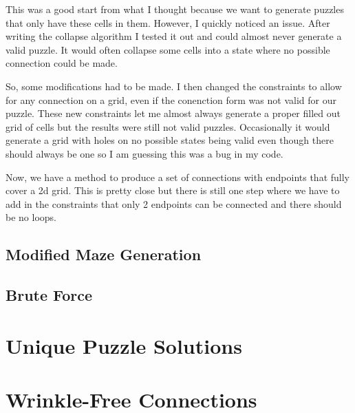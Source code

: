\documentclass[10pt,a4paper,openany]{article}
\begin{document}
This was a good start from what I thought because we want to generate puzzles that only have these cells in them. However, I quickly noticed an issue.
After writing the collapse algorithm I tested it out and could almost never generate a valid puzzle. It would often collapse some cells into a state where no possible connection could be made.

So, some modifications had to be made. I then changed the constraints to allow for any connection on a grid, even if the conenction form was not valid for our puzzle.
These new constraints let me almost always generate a proper filled out grid of cells but the results were still not valid puzzles.
Occasionally it would generate a grid with holes on no possible states being valid even though there should always be one so I am guessing this was a bug in my code.

Now, we have a method to produce a set of connections with endpoints that fully cover a 2d grid. This is pretty close but there is still one step where we have to add in the constraints that only 2 endpoints can be connected and there should be no loops.

\subsection{Modified Maze Generation}

\subsection{Brute Force}



\section{Unique Puzzle Solutions}

\section{Wrinkle-Free Connections}
\end{document}
